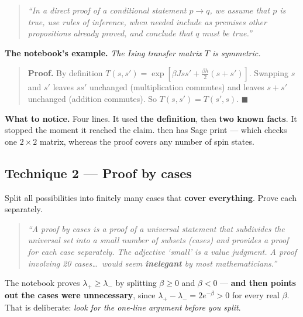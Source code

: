\begin{bookbox}[title={D\&L §2.2, in their words}]
\begin{quote}\itshape
``In a direct proof of a conditional statement $p\to q$, we assume that $p$ is true, use rules of
inference, when needed include as premises other propositions already proved, and conclude that $q$
must be true.''
\end{quote}
\end{bookbox}

\noindent\textbf{The notebook's example.} \emph{The Ising transfer matrix $T$ is symmetric.}

\begin{quote}
\textbf{Proof.} By definition $T(s,s')=\exp[\beta Jss'+\tfrac{\beta h}{2}(s+s')]$. Swapping $s$ and
$s'$ leaves $ss'$ unchanged (multiplication commutes) and leaves $s+s'$ unchanged (addition
commutes). So $T(s,s')=T(s',s)$. $\blacksquare$
\end{quote}

\textbf{What to notice.} Four lines. It used \textbf{the definition}, then \textbf{two known facts}.
It stopped the moment it reached the claim.  then has Sage print  --- which checks one $2\times2$ matrix, whereas the proof covers any number of
spin states.

\subsection{Technique 2 --- Proof by cases \ \ }

\begin{techbox}[title={Shape}]
Split all possibilities into finitely many cases that \textbf{cover everything}. Prove each
separately.
\end{techbox}

\begin{bookbox}[title={D\&L §2.3.1 --- including a warning about taste}]
\begin{quote}\itshape
``A proof by cases is a proof of a universal statement that subdivides the universal set into a
small number of subsets (cases) and provides a proof for each case separately. The adjective `small'
is a value judgment. A proof involving 20 cases\ldots\ would seem \textbf{inelegant} by most
mathematicians.''
\end{quote}
\end{bookbox}

\noindent The notebook proves $\lambda_+\ge\lambda_-$ by splitting $\beta\ge0$ and $\beta<0$ ---
\textbf{and then points out the cases were unnecessary}, since $\lambda_+-\lambda_-=2e^{-\beta}>0$
for every real $\beta$. That is deliberate: \emph{look for the one-line argument before you split}.

